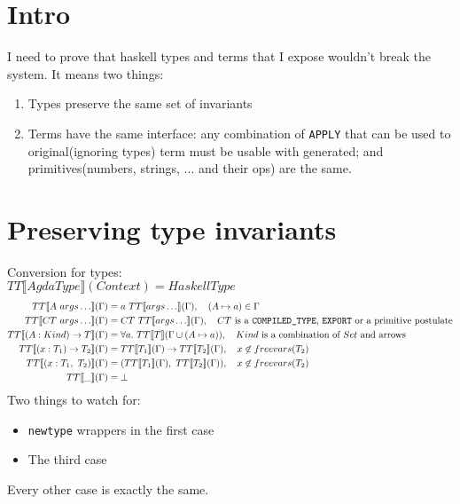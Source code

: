 \section{Intro}

I need to prove that haskell types and terms that I expose wouldn't break the system.  It means two things:
\begin{enumerate}
\item Types preserve the same set of invariants
\item Terms have the same interface: any combination of \texttt{APPLY} that can be used to original(ignoring types)
      term must be usable with generated; and primitives(numbers, strings, ... and their ops) are the same.
\end{enumerate}

\section{Preserving type invariants}

Conversion for types:\\
\(TT\llbracket AgdaType \rrbracket(Context) = HaskellType \)
\begin{align*}
   TT\llbracket A\ args\ldots \rrbracket(\Gamma) &= a\ TT\llbracket args\ldots \rrbracket(\Gamma),
      \quad (A \mapsto a) \in \Gamma \\
   TT\llbracket CT\ args\ldots \rrbracket(\Gamma) &= CT\ TT\llbracket args\ldots \rrbracket(\Gamma),
      \quad CT\text{ is a \texttt{COMPILED\_TYPE}, \texttt{EXPORT} or a primitive postulate}\\
   TT\llbracket (A : Kind) \rightarrow T \rrbracket(\Gamma) &= \forall a.\ TT\llbracket T \rrbracket(\Gamma \cup (A \mapsto a)),
      \quad Kind\text{ is a combination of \(Set\) and arrows}\\
   TT\llbracket (x : T_1) \rightarrow T_2 \rrbracket(\Gamma) &=
      TT\llbracket T_1 \rrbracket(\Gamma) \rightarrow TT\llbracket T_2 \rrbracket(\Gamma),
      \quad x \not\in freevars(T_2) \\
   TT\llbracket (x : T_1,\ T_2) \rrbracket(\Gamma) &=
      (TT\llbracket T_1 \rrbracket(\Gamma),\ TT\llbracket T_2 \rrbracket(\Gamma)),
      \quad x \not\in freevars(T_2) \\
   TT\llbracket \_ \rrbracket(\Gamma) &= \bot\\
\end{align*}
Two things to watch for:
\begin{itemize}
\item \texttt{newtype} wrappers in the first case
\item The third case
\end{itemize}
Every other case is exactly the same.

